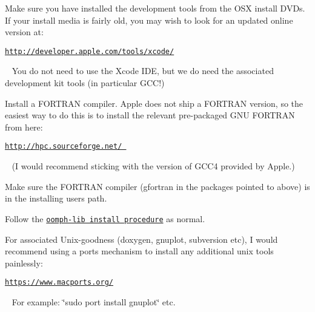 \begin{DoxyEnumerate}
\item Make sure you have installed the development tools from the O\+SX install D\+V\+Ds. If your install media is fairly old, you may wish to look for an updated online version at\+: ~\newline
~\newline
\begin{center} \href{http://developer.apple.com/tools/xcode/}{\tt http\+://developer.\+apple.\+com/tools/xcode/} \end{center}  ~\newline
You do not need to use the Xcode I\+DE, but we do need the associated development kit tools (in particular G\+C\+C!) ~\newline
~\newline

\item Install a F\+O\+R\+T\+R\+AN compiler. Apple does not ship a F\+O\+R\+T\+R\+AN version, so the easiest way to do this is to install the relevant pre-\/packaged G\+NU F\+O\+R\+T\+R\+AN from here\+: ~\newline
~\newline
\begin{center} \href{http://hpc.sourceforge.net/}{\tt http\+://hpc.\+sourceforge.\+net/ } \end{center}  ~\newline
(I would recommend sticking with the version of G\+C\+C4 provided by Apple.) ~\newline
~\newline

\item Make sure the F\+O\+R\+T\+R\+AN compiler (\textquotesingle{}gfortran\textquotesingle{} in the packages pointed to above) is in the installing user\textquotesingle{}s path. ~\newline
~\newline

\item Follow the \href{../../the_distribution/html/index.html}{\tt oomph-\/lib install procedure} as normal. ~\newline
~\newline

\item For associated Unix-\/goodness (doxygen, gnuplot, subversion etc), I would recommend using a ports mechanism to install any additional unix tools painlessly\+: ~\newline
~\newline
\begin{center} \href{https://www.macports.org/}{\tt https\+://www.\+macports.\+org/} \end{center}  ~\newline
For example\+: \char`\"{}sudo port install gnuplot\char`\"{} etc.
\end{DoxyEnumerate}

